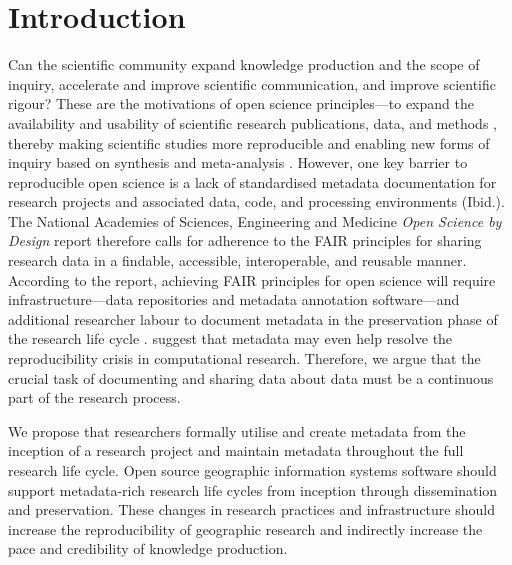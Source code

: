 \documentclass{isprs} %
\begin{document}

\maketitle


\sloppy

\section{Introduction}\label{Introduction}

Can the scientific community expand knowledge production and the scope of inquiry, accelerate and improve scientific communication, and improve scientific rigour?
These are the motivations of open science principles---to expand the availability and usability of scientific research publications, data, and methods \citep{NASEM2018}, thereby making scientific studies more reproducible  and enabling new forms of inquiry based on synthesis and meta-analysis \citep{NASEM2018,NASEM2019}.
However, one key barrier to reproducible open science is a lack of standardised metadata documentation for research projects and associated data, code, and processing environments (Ibid.).
The National Academies of Sciences, Engineering and Medicine \citep{NASEM2018} \textit{Open Science by Design} report therefore calls for adherence to the FAIR principles \citep{Wilkinson2016} for sharing research data in a findable, accessible, interoperable, and reusable manner.
According to the report, achieving FAIR principles for open science will require infrastructure---data repositories and metadata annotation software---and additional researcher labour to document metadata in the preservation phase of the research life cycle \citep{NASEM2018}. 
\citet{Leipzig2021} suggest that metadata may even help resolve the reproducibility crisis in computational research.
Therefore, we argue that the crucial task of documenting and sharing data about data must be a continuous part of the research process.

We propose that researchers formally utilise and create metadata from the inception of a research project and maintain metadata throughout the full research life cycle.
Open source geographic information systems software should support metadata-rich research life cycles from inception through dissemination and preservation.
These changes in research practices and infrastructure should increase the reproducibility of geographic research and indirectly increase the pace and credibility of knowledge production. 
\end{document}

